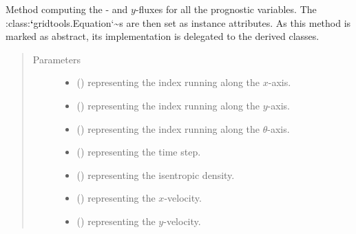 \documentclass[letterpaper,10pt,english]{sphinxmanual}
\begin{document}
\begin{fulllineitems}
\begin{fulllineitems}
\label{\detokenize{api:dycore.flux_isentropic_nonconservative.FluxIsentropicNonconservative._compute_horizontal_fluxes}}
Method computing the - and \(y\)-fluxes for
all the prognostic variables. The :class:{\color{red}\bfseries{}{}`}gridtools.Equation{}`\textasciitilde{}s are then set as instance attributes.
As this method is marked as abstract, its implementation is delegated to the derived classes.
\begin{quote}\begin{description}
\item[{Parameters}] \leavevmode\begin{itemize}
\item {} 
 () \textendash{}  representing the index running along the \(x\)-axis.

\item {} 
 () \textendash{}  representing the index running along the \(y\)-axis.

\item {} 
 () \textendash{}  representing the index running along the \(\theta\)-axis.

\item {} 
 () \textendash{}  representing the time step.

\item {} 
 () \textendash{}  representing the isentropic density.

\item {} 
 () \textendash{}  representing the \(x\)-velocity.

\item {} 
 () \textendash{}  representing the \(y\)-velocity.


\end{itemize}
\end{description}
\end{quote}
\end{fulllineitems}
\end{fulllineitems}
\end{document}
